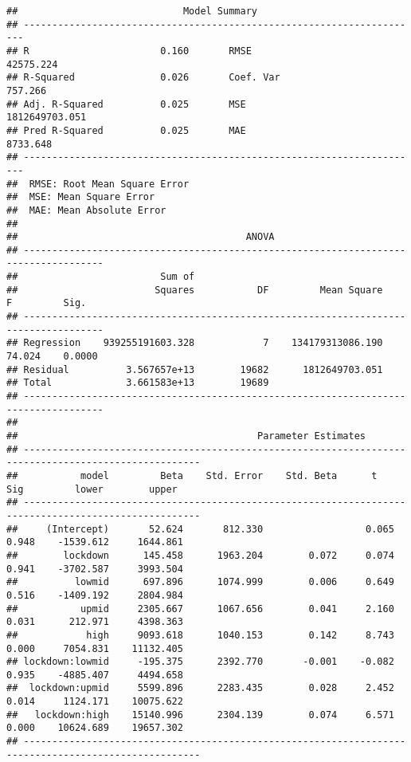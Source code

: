 \documentclass[]{article}
\begin{document}
\begin{verbatim}
##                             Model Summary                              
## ----------------------------------------------------------------------
## R                       0.160       RMSE                    42575.224 
## R-Squared               0.026       Coef. Var                 757.266 
## Adj. R-Squared          0.025       MSE                1812649703.051 
## Pred R-Squared          0.025       MAE                      8733.648 
## ----------------------------------------------------------------------
##  RMSE: Root Mean Square Error 
##  MSE: Mean Square Error 
##  MAE: Mean Absolute Error 
## 
##                                        ANOVA                                         
## ------------------------------------------------------------------------------------
##                         Sum of                                                      
##                        Squares           DF         Mean Square      F         Sig. 
## ------------------------------------------------------------------------------------
## Regression    939255191603.328            7    134179313086.190    74.024    0.0000 
## Residual          3.567657e+13        19682      1812649703.051                     
## Total             3.661583e+13        19689                                         
## ------------------------------------------------------------------------------------
## 
##                                          Parameter Estimates                                          
## -----------------------------------------------------------------------------------------------------
##           model         Beta    Std. Error    Std. Beta      t        Sig         lower        upper 
## -----------------------------------------------------------------------------------------------------
##     (Intercept)       52.624       812.330                  0.065    0.948    -1539.612     1644.861 
##        lockdown      145.458      1963.204        0.072     0.074    0.941    -3702.587     3993.504 
##          lowmid      697.896      1074.999        0.006     0.649    0.516    -1409.192     2804.984 
##           upmid     2305.667      1067.656        0.041     2.160    0.031      212.971     4398.363 
##            high     9093.618      1040.153        0.142     8.743    0.000     7054.831    11132.405 
## lockdown:lowmid     -195.375      2392.770       -0.001    -0.082    0.935    -4885.407     4494.658 
##  lockdown:upmid     5599.896      2283.435        0.028     2.452    0.014     1124.171    10075.622 
##   lockdown:high    15140.996      2304.139        0.074     6.571    0.000    10624.689    19657.302 
## -----------------------------------------------------------------------------------------------------
\end{verbatim}
\end{document}
